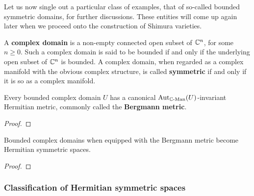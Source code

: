             \begin{example} \label{example: complex_elliptic_curves_are_symmetric_spaces}
                
            \end{example}
            Let us now single out a particular class of examples, that of so-called bounded symmetric domains, for further discussions. These entities will come up again later when we proceed onto the construction of Shimura varieties. 
            \begin{definition}[Domains] \label{def: complex_domains}
                A \textbf{complex domain} is a non-empty connected open subset of $\mathbb{C}^n$, for some $n \geq 0$. Such a complex domain is said to be bounded if and only if the underlying open subset of $\mathbb{C}^n$ is bounded. A complex domain, when regarded as a complex manifold with the obvious complex structure, is called \textbf{symmetric} if and only if it is so as a complex manifold. 
            \end{definition}
            \begin{proposition} \label{prop: bounded}
                Every bounded complex domain $U$ has a canonical $\mathrm{Aut}_{\mathbb{C}\text{-}\mathrm{Man}}(U)$-invariant Hermitian metric, commonly called the \textbf{Bergmann metric}.
            \end{proposition}
                \begin{proof}
                    
                \end{proof}
            \begin{corollary}
                Bounded complex domains when equipped with the Bergmann metric become Hermitian symmetric spaces. 
            \end{corollary}
                \begin{proof}
                    
                \end{proof}
            \begin{example}[]
                
            \end{example}
            
        \subsubsection{Classification of Hermitian symmetric spaces}
        

